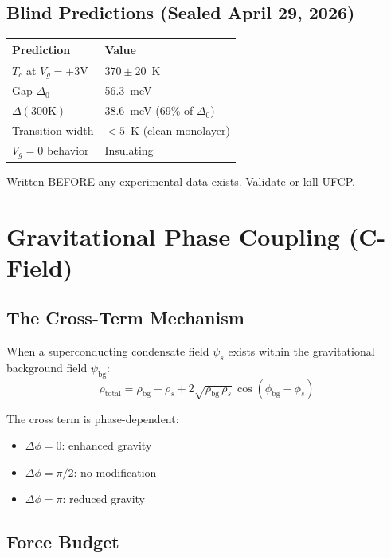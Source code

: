 \documentclass[11pt, a4paper]{article}
\begin{document}
\subsection{Blind Predictions (Sealed April 29, 2026)}

\begin{center}
\begin{tabular}{@{}ll@{}}
\toprule
\textbf{Prediction} & \textbf{Value} \\
\midrule
$T_c$ at $V_g = +3$V & $370 \pm 20$~K \\
Gap $\Delta_0$ & 56.3~meV \\
$\Delta(300\text{K})$ & 38.6~meV (69\% of $\Delta_0$) \\
Transition width & $< 5$~K (clean monolayer) \\
$V_g = 0$ behavior & Insulating \\
\bottomrule
\end{tabular}
\end{center}

Written BEFORE any experimental data exists. Validate or kill UFCP.

\section{Gravitational Phase Coupling (C-Field)}

\subsection{The Cross-Term Mechanism}

When a superconducting condensate field $\psi_s$ exists within
the gravitational background field $\psi_{\text{bg}}$:
\begin{equation}
  \rho_{\text{total}} = \rho_{\text{bg}} + \rho_s
  + 2\sqrt{\rho_{\text{bg}}\,\rho_s}\,
  \cos(\phi_{\text{bg}} - \phi_s)
\end{equation}

The cross term is phase-dependent:
\begin{itemize}[nosep]
  \item $\Delta\phi = 0$: enhanced gravity
  \item $\Delta\phi = \pi/2$: no modification
  \item $\Delta\phi = \pi$: reduced gravity
\end{itemize}

\subsection{Force Budget}
\end{document}
